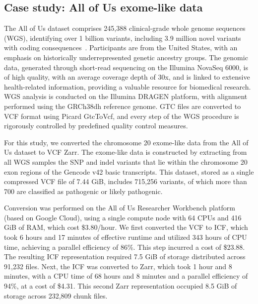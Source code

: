 \documentclass[a4paper,num-refs]{oup-contemporary}
\begin{document}
\subsection{Case study: All of Us exome-like data} 
The All of Us dataset comprises 245,388 clinical-grade whole genome sequences (WGS), 
identifying over 1 billion variants, including 3.9 million novel variants 
with coding consequences~\citep{all2024genomic}. Participants are from the United States, 
with an emphasis on historically underrepresented genetic ancestry groups. 
The genomic data, generated through short-read sequencing on the Illumina NovaSeq 6000, 
is of high quality, with an average coverage depth of 30x, and is linked to extensive 
health-related information, providing a valuable resource for biomedical research. 
WGS analysis is conducted on the Illumina DRAGEN platform, with alignment performed 
using the GRCh38dh reference genome. GTC files are converted to VCF format using 
Picard GtcToVcf, and every step of the WGS procedure is rigorously controlled by 
predefined quality control measures.

For this study, we converted the chromosome 20 exome-like 
data from the All of Us dataset to VCF Zarr.
The exome-like data is constructed by extracting from all WGS samples
the SNP and indel variants that lie within the chromosome 20 exon regions of the Gencode v42 basic 
transcripts. This dataset, stored as a single compressed VCF file of 7.44 GiB, 
includes 715,256 variants, of which more than 700 are classified as pathogenic or likely pathogenic.

Conversion was performed on the All of Us Researcher Workbench platform 
(based on Google Cloud), using a single compute node with 64 CPUs and 416 GiB 
of RAM, which cost \$3.80/hour. We first converted the VCF to  ICF, which 
took 6 hours and 17 minutes of effective runtime and utilized 343 hours of CPU 
time, achieving a parallel efficiency of 86\%. This step incurred a cost of 
\$23.88. The resulting ICF representation required 7.5 GiB of storage distributed 
across 91,232 files. Next, the ICF was converted to Zarr, which took 1 hour and 8 minutes, with 
a CPU time of 68 hours and 8 minutes and a parallel efficiency of 94\%, at a 
cost of \$4.31. This second Zarr representation occupied 8.5 GiB of storage across 
232,809 chunk files.
\end{document}

